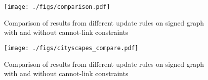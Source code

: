 
\begin{figure}[t]
\centering
\texttt{[image: ./figs/comparison.pdf]} %
\caption{
{\small Comparison of results from different update rules on signed graph with and without cannot-link constraints 
}
\label{fig:cremi_comparison}}
\end{figure}
\begin{figure}[b]
\centering
\texttt{[image: ./figs/cityscapes\_compare.pdf]} %
\caption{
{\small Comparison of results from different update rules on signed graph with and without cannot-link constraints 
}
\label{fig:cytiscapes_comparison}}
\end{figure}




